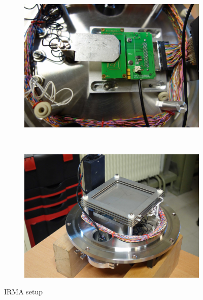 \begin{figure}[!ht]
	\begin{subfigure}{0.5\textwidth}
		\includegraphics[width=\textwidth]{04_IPHI_Test/figures/fig000_IRMA_setup01.jpg}
		\caption{}
		\label{}
	\end{subfigure}
	~
	\begin{subfigure}{0.5\textwidth}
		\includegraphics[width=\textwidth]{04_IPHI_Test/figures/fig000_IRMA_setup02.jpg}
		\caption{}
		\label{}
	\end{subfigure}
	\caption[IRMA setup]{IRMA setup}
	\label{chap4:IRMA_setup}
\end{figure}

